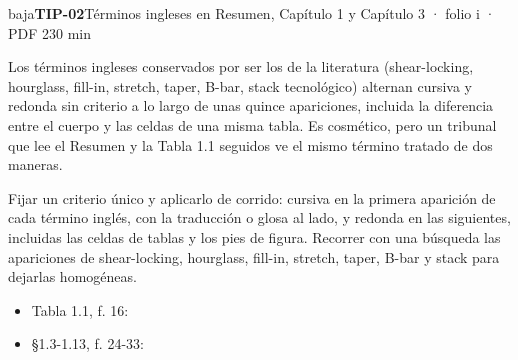 \begin{ficha}{baja}{\casilla\textbf{TIP-02}\quad{}\quad Términos ingleses en Resumen, Capítulo 1 y Capítulo 3 · folio i · PDF 2\hfill 30 min}
\par
{}Los términos ingleses conservados por ser los de la literatura (shear-locking, hourglass, fill-in, stretch, taper, B-bar, stack tecnológico) alternan cursiva y redonda sin criterio a lo largo de unas quince apariciones, incluida la diferencia entre el cuerpo y las celdas de una misma tabla. Es cosmético, pero un tribunal que lee el Resumen y la Tabla 1.1 seguidos ve el mismo término tratado de dos maneras.\par
{}Fijar un criterio único y aplicarlo de corrido: cursiva en la primera aparición de cada término inglés, con la traducción o glosa al lado, y redonda en las siguientes, incluidas las celdas de tablas y los pies de figura. Recorrer con una búsqueda las apariciones de shear-locking, hourglass, fill-in, stretch, taper, B-bar y stack para dejarlas homogéneas.\par
{}\begin{itemize}[leftmargin=1.2em,itemsep=1pt,topsep=1pt]
\item {\small Tabla 1.1, f. 16: }
\item {\small §1.3-1.13, f. 24-33: }
\end{itemize}
\end{ficha}
